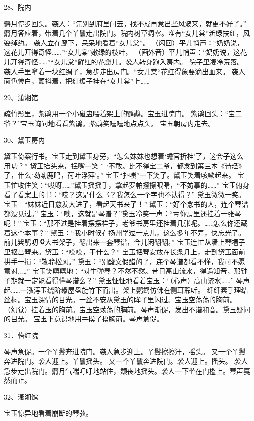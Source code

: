 28、院内\par
麝月停步回头。袭人：“先别到府里问去，找不成再惹出些风波来，就更不好了。”
麝月答应着，带着几个丫鬟走出院门。院内树草凋零。唯有“女儿棠”新绿扶红，风姿绰约。
袭人立在廊下，呆呆地看着“女儿棠”。
（闪回）平儿悄声：“奶奶说，这花儿开得奇怪……”“女儿棠”嫩绿的枝叶。
（画外音）平儿悄声：“奶奶说，这花儿开得奇怪……”“女儿棠”鲜红的花瓣儿。袭人转身跑入房内。
院子里凄冷荒落。袭人手里拿着一块红绸子，急步走出房门。“女儿棠“花红得象要滴出血来。
袭人面色惨白，颤抖着，把红绸子挂在“女儿棠”上……

29、潇湘馆\par
疏竹影里，紫鹃用一个小磁盅喂着架上的鹦鹉。宝玉进院门。
紫鹃回头：“宝二爷？”宝玉询问地看看紫鹃。紫鹃笑嘻嘻地点点头。
宝玉朝房内走去。

30、黛玉房内\par
黛玉倚案行书。宝玉走到黛玉身旁，“怎么妹妹也想着‘蟾官折桂’了，这会子这么用功？”
黛玉抬头来，抿嘴一笑：“不敢。比不得宝二爷，都念到第三本《诗经》了，什么‘呦呦鹿鸣，荷叶浮萍’。”
宝玉“扑嗤”一下笑了。黛玉笑着咳嗽起来。
宝玉忙收住笑：“哎呀……”黛玉摇摇手，拿起罗帕擦擦眼睛，“不妨事的……”
宝玉俯身看了看案上的书：“哎？这是什么书？我怎么一个字也不认得？”
黛玉微微一笑。宝玉：“妹妹近日愈发大进了，看起天书来了！”
黛玉：“好个念书的人，连个琴谱都没见过。”
宝玉：“噢，这就是琴谱？”黛玉冷笑一声：“亏你房里还挂着一张琴呢！”
宝玉：“那不过是挂着摆摆样子，老爷书房里还挂着几张呢。……怎么你还藏着这个本事？”
黛玉：“我小时候在扬州学过一点儿，这么多年不弄，快忘光了。前儿紫鹃叨噔大书架子，翻出来一套琴谱，今儿闲翻翻。”
宝玉连忙从墙上琴槽子里抠出琴来。黛玉：“哎哎，干什么？”
宝玉把琴安放在长条几上，走到黛玉面前拱手一揖：“敬聆松风。”
黛玉：“别酸文假醋的了，连个琴谱都看不懂，我可不愿意对……”
宝玉笑嘻嘻地：“对牛弹琴？不然不然。昔日高山流水，得遇知音，那钟子期就一定能看得懂琴谱么？”
黛玉怔怔地看着宝玉：“（心声）高山流水……”
琴声起……一泓泻玉绕阶缘屋盘旋竹下而出。架上鹦鹉仿佛在侧耳聆听。
纤纤素手理结丝桐。宝玉深情的目光。一丝不安从黛玉的眸子里闪过。宝玉空荡荡的胸前。
（幻觉）挂着玉的胸前。宝玉空荡荡的胸前。琴声渐促，发出不谐和音。黛玉疑问的目光。
宝玉下意识地用手摸了摸胸前。琴声急促。

31、怡红院\par
琴声急促。一个丫鬟奔进院门。袭人急步迎上。丫鬟擦擦汗，摇头。
又一个丫鬟奔进院门。袭人迎上。丫鬟摇头。
又一个丫鬟奔进院门。袭人迎上。摇头。
袭人急步走出院门。麝月气喘吁吁地站住，颓丧地摇头。袭人一下坐在门槛上。琴声戛然而止。

32、潇湘馆\par
宝玉惊异地看着崩断的琴弦。


